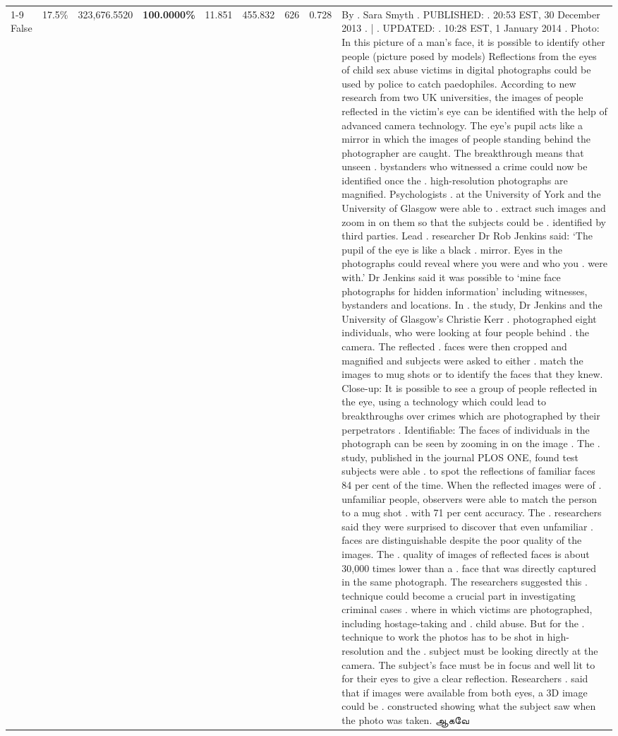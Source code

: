 \begin{table}[H]
\begin{tabular}{lllrlllll}
\cline{1-9}
False & 17.5\% & 323,676.5520 & \bfseries \color{red} 100.0000\% & 11.851 & 455.832 & 626 & 0.728 & By . Sara Smyth . PUBLISHED: . 20:53 EST, 30 December 2013 . | . UPDATED: . 10:28 EST, 1 January 2014 . Photo: In this picture of a man's face, it is possible to identify other people (picture posed by models) Reflections from the eyes of child sex abuse victims in digital photographs could be used by police to catch paedophiles. According to new research from two UK universities, the images of people reflected in the victim's eye can be identified with the help of advanced camera technology. The eye's pupil acts like a mirror in which the images of people standing behind the photographer are caught. The breakthrough means that unseen . bystanders who witnessed a crime could now be identified once the . high-resolution photographs are magnified. Psychologists . at the University of York and the University of Glasgow were able to . extract such images and zoom in on them so that the subjects could be . identified by third parties. Lead . researcher Dr Rob Jenkins said: ‘The pupil of the eye is like a black . mirror. Eyes in the photographs could reveal where you were and who you . were with.' Dr Jenkins said it was possible to ‘mine face photographs for hidden information' including witnesses, bystanders and locations. In . the study, Dr Jenkins and the University of Glasgow's Christie Kerr . photographed eight individuals, who were looking at four people behind . the camera. The reflected . faces were then cropped and magnified and subjects were asked to either . match the images to mug shots or to identify the faces that they knew. Close-up: It is possible to see a group of people reflected in the eye, using a technology which could lead to breakthroughs over crimes which are photographed by their perpetrators . Identifiable: The faces of individuals in the photograph can be seen by zooming in on the image . The . study, published in the journal PLOS ONE, found test subjects were able . to spot the reflections of familiar faces 84 per cent of the time. When the reflected images were of . unfamiliar people, observers were able to match the person to a mug shot . with 71 per cent accuracy. The . researchers said they were surprised to discover that even unfamiliar . faces are distinguishable despite the poor quality of the images. The . quality of images of reflected faces is about 30,000 times lower than a . face that was directly captured in the same photograph. The researchers suggested this . technique could become a crucial part in investigating criminal cases . where in which victims are photographed, including hostage-taking and . child abuse. But for the . technique to work the photos has to be shot in high-resolution and the . subject must be looking directly at the camera. The subject's face must be in focus and well lit to for their eyes to give a clear reflection. Researchers . said that if images were available from both eyes, a 3D image could be . constructed showing what the subject saw when the photo was taken. ஆகவே \\

\end{tabular}
\end{table}

